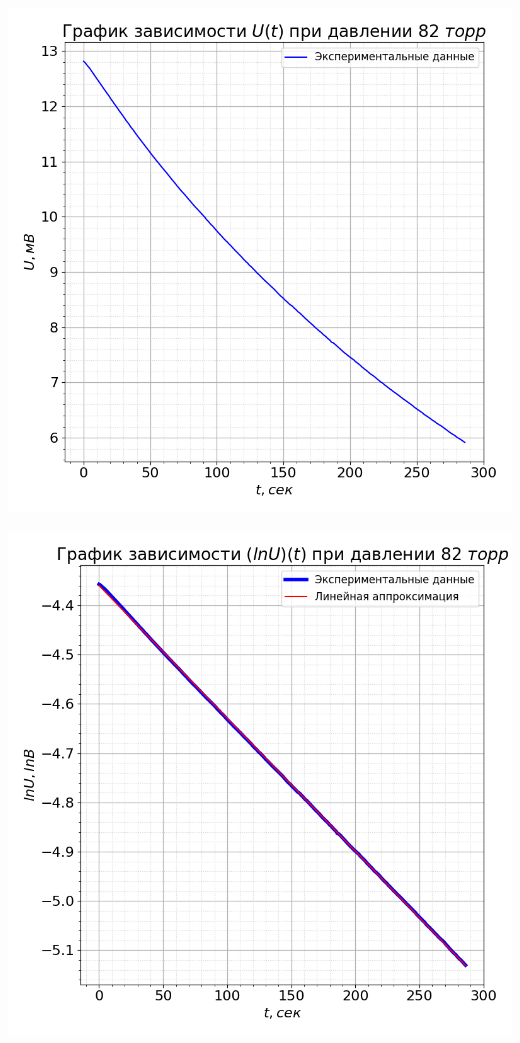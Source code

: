 \documentclass[a4paper, 12pt]{article}
\begin{document}
        \begin{minipage}{0.47\textwidth}
            \includegraphics[width=1\linewidth]{graphs/raw82.png}
        \end{minipage}
        \begin{minipage}{0.47\textwidth}
            \includegraphics[width=1\linewidth]{graphs/log82.png}
        \end{minipage}
\end{document}
